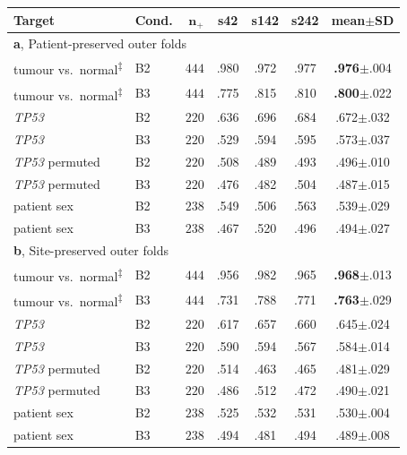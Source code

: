 \begin{tabular}{l l r c c c c}
\toprule
\textbf{Target} & \textbf{Cond.} & $\boldsymbol{n_+}$ &
\textbf{s42} & \textbf{s142} & \textbf{s242} & \textbf{mean}$\pm$\textbf{SD} \\
\midrule
\multicolumn{7}{l}{\textbf{a}, Patient-preserved outer folds}\\
\addlinespace[1pt]
tumour vs.\ normal\textsuperscript{$\ddagger$}
                & B2 & $444$ & .980 & .972 & .977 & \textbf{.976}$\pm$.004 \\
tumour vs.\ normal\textsuperscript{$\ddagger$}
                & B3 & $444$ & .775 & .815 & .810 & \textbf{.800}$\pm$.022 \\
\addlinespace[2pt]
\textit{TP53}   & B2 & $220$ & .636 & .696 & .684 & .672$\pm$.032 \\
\textit{TP53}   & B3 & $220$ & .529 & .594 & .595 & .573$\pm$.037 \\
\addlinespace[2pt]
\textit{TP53} permuted & B2 & $220$ & .508 & .489 & .493 & .496$\pm$.010 \\
\textit{TP53} permuted & B3 & $220$ & .476 & .482 & .504 & .487$\pm$.015 \\
\addlinespace[2pt]
patient sex     & B2 & $238$ & .549 & .506 & .563 & .539$\pm$.029 \\
patient sex     & B3 & $238$ & .467 & .520 & .496 & .494$\pm$.027 \\
\midrule
\multicolumn{7}{l}{\textbf{b}, Site-preserved outer folds}\\
\addlinespace[1pt]
tumour vs.\ normal\textsuperscript{$\ddagger$}
                & B2 & $444$ & .956 & .982 & .965 & \textbf{.968}$\pm$.013 \\
tumour vs.\ normal\textsuperscript{$\ddagger$}
                & B3 & $444$ & .731 & .788 & .771 & \textbf{.763}$\pm$.029 \\
\addlinespace[2pt]
\textit{TP53}   & B2 & $220$ & .617 & .657 & .660 & .645$\pm$.024 \\
\textit{TP53}   & B3 & $220$ & .590 & .594 & .567 & .584$\pm$.014 \\
\addlinespace[2pt]
\textit{TP53} permuted & B2 & $220$ & .514 & .463 & .465 & .481$\pm$.029 \\
\textit{TP53} permuted & B3 & $220$ & .486 & .512 & .472 & .490$\pm$.021 \\
\addlinespace[2pt]
patient sex     & B2 & $238$ & .525 & .532 & .531 & .530$\pm$.004 \\
patient sex     & B3 & $238$ & .494 & .481 & .494 & .489$\pm$.008 \\
\bottomrule
\end{tabular}

